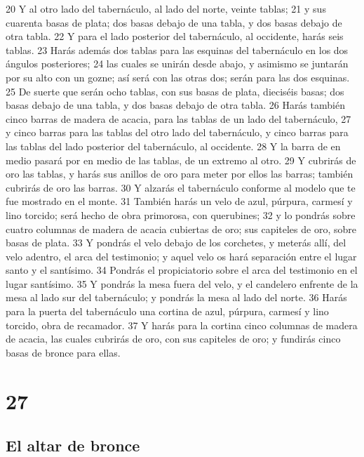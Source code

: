 20 Y al otro lado del tabernáculo, al lado del norte, veinte tablas;
21 y sus cuarenta basas de plata; dos basas debajo de una tabla, y dos basas debajo de otra tabla.
22 Y para el lado posterior del tabernáculo, al occidente, harás seis tablas.
23 Harás además dos tablas para las esquinas del tabernáculo en los dos ángulos posteriores;
24 las cuales se unirán desde abajo, y asimismo se juntarán por su alto con un gozne; así será con las otras dos; serán para las dos esquinas.
25 De suerte que serán ocho tablas, con sus basas de plata, dieciséis basas; dos basas debajo de una tabla, y dos basas debajo de otra tabla.
26 Harás también cinco barras de madera de acacia, para las tablas de un lado del tabernáculo,
27 y cinco barras para las tablas del otro lado del tabernáculo, y cinco barras para las tablas del lado posterior del tabernáculo, al occidente.
28 Y la barra de en medio pasará por en medio de las tablas, de un extremo al otro.
29 Y cubrirás de oro las tablas, y harás sus anillos de oro para meter por ellos las barras; también cubrirás de oro las barras.
30 Y alzarás el tabernáculo conforme al modelo que te fue mostrado en el monte.
31 También harás un velo de azul, púrpura, carmesí y lino torcido; será hecho de obra primorosa, con querubines;
32 y lo pondrás sobre cuatro columnas de madera de acacia cubiertas de oro; sus capiteles de oro, sobre basas de plata.
33 Y pondrás el velo debajo de los corchetes, y meterás allí, del velo adentro, el arca del testimonio; y aquel velo os hará separación entre el lugar santo y el santísimo.
34 Pondrás el propiciatorio sobre el arca del testimonio en el lugar santísimo.
35 Y pondrás la mesa fuera del velo, y el candelero enfrente de la mesa al lado sur del tabernáculo; y pondrás la mesa al lado del norte.
36 Harás para la puerta del tabernáculo una cortina de azul, púrpura, carmesí y lino torcido, obra de recamador.
37 Y harás para la cortina cinco columnas de madera de acacia, las cuales cubrirás de oro, con sus capiteles de oro; y fundirás cinco basas de bronce para ellas.

\chapter{27}

\section*{El altar de bronce}

